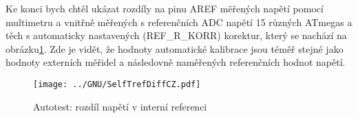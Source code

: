 Ke konci bych chtěl ukázat rozdíly na pinu AREF měřených napětí pomocí multimetru
a vnitřně měřených s referenčních ADC napětí 15 různých ATmegas a těch s automaticky
nastavených (REF\_R\_KORR)  korektur, který se nachází na obrázku\ref{fig:SelfTrefDiff}.
Zde je vidět, že hodnoty automatické kalibrace jsou téměř stejné jako hodnoty externích měřidel a
následovně naměřených referenčních hodnot napětí.
\begin{figure}[H]
  \centering
  \texttt{[image: ../GNU/SelfTrefDiffCZ.pdf]}
  \caption{Autotest: rozdíl napětí v interní referenci}
  \label{fig:SelfTrefDiff}
\end{figure}

